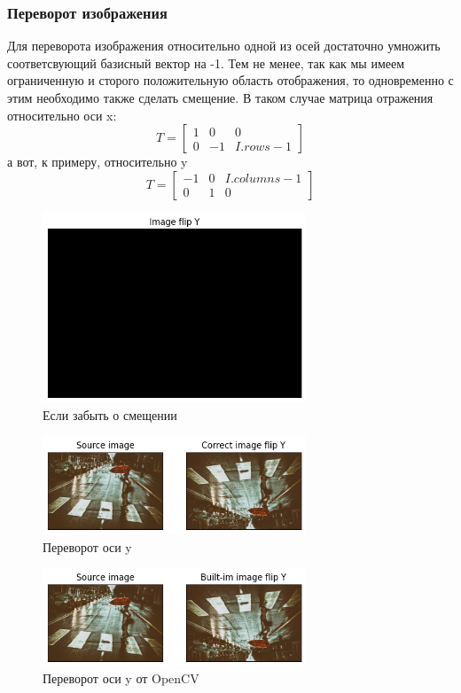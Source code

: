 \documentclass[a4paper,12pt]{article}
\begin{document}
\subsubsection{Переворот изображения}
Для переворота изображения относительно одной из осей достаточно умножить соответсвующий базисный вектор на -1. Тем не менее, так как мы имеем ограниченную и сторого положительную область отображения, то одновременно с этим необходимо также сделать смещение. 
В таком случае матрица отражения относительно оси x:
$$
	T =
	\begin{bmatrix}
		1 & 0 & 0
		\\ 0 & -1 & I.rows - 1
	\end{bmatrix}
$$
а вот, к примеру, относительно y 
$$
	T =
	\begin{bmatrix}
		-1 & 0 & I.columns - 1
		\\ 0 & 1 & 0
	\end{bmatrix}
$$
\begin{figure}[H]
    \centering \includegraphics[width=0.7\textwidth]{my_images/9.png}
    \caption{Если забыть о смещении}
\end{figure}
\begin{figure}[H]
    \centering \includegraphics[width=0.7\textwidth]{my_images/10.png}
    \caption{Переворот оси y}
\end{figure}
\begin{figure}[H]
    \centering \includegraphics[width=0.7\textwidth]{my_images/11.png}
    \caption{Переворот оси y от OpenCV}
\end{figure}
\end{document}

